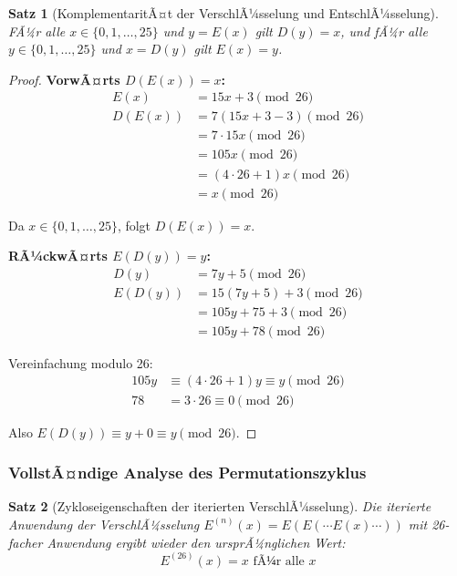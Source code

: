 ﻿\documentclass[12pt,a4paper]{article}
\newtheorem{theorem}{Satz}
\begin{document}
	\begin{theorem}[KomplementaritÃ¤t der VerschlÃ¼sselung und EntschlÃ¼sselung]
		FÃ¼r alle $x \in \{0, 1, \ldots, 25\}$ und $y = E(x)$ gilt $D(y) = x$, und fÃ¼r alle $y \in \{0, 1, \ldots, 25\}$ und $x = D(y)$ gilt $E(x) = y$.
	\end{theorem}
	
	\begin{proof}
		\textbf{VorwÃ¤rts $D(E(x)) = x$:}
		\begin{align}
			E(x) &= 15x + 3 \pmod{26} \\
			D(E(x)) &= 7(15x + 3 - 3) \pmod{26} \\
			&= 7 \cdot 15x \pmod{26} \\
			&= 105x \pmod{26} \\
			&= (4 \cdot 26 + 1)x \pmod{26} \\
			&= x \pmod{26}
		\end{align}
		
		Da $x \in \{0, 1, \ldots, 25\}$, folgt $D(E(x)) = x$. \checkmark
		
		\textbf{RÃ¼ckwÃ¤rts $E(D(y)) = y$:}
		\begin{align}
			D(y) &= 7y + 5 \pmod{26} \\
			E(D(y)) &= 15(7y + 5) + 3 \pmod{26} \\
			&= 105y + 75 + 3 \pmod{26} \\
			&= 105y + 78 \pmod{26}
		\end{align}
		
		Vereinfachung modulo 26:
		\begin{align}
			105y &\equiv (4 \cdot 26 + 1)y \equiv y \pmod{26} \\
			78 &= 3 \cdot 26 \equiv 0 \pmod{26}
		\end{align}
		
		Also $E(D(y)) \equiv y + 0 \equiv y \pmod{26}$. \checkmark
	\end{proof}
	
	\subsubsection{VollstÃ¤ndige Analyse des Permutationszyklus}
	
	\begin{theorem}[Zykloseigenschaften der iterierten VerschlÃ¼sselung]
		Die iterierte Anwendung der VerschlÃ¼sselung $E^{(n)}(x) = E(E(\cdots E(x) \cdots))$ mit 26-facher Anwendung ergibt wieder den ursprÃ¼nglichen Wert:
		\begin{equation}
			E^{(26)}(x) = x \text{ fÃ¼r alle } x
		\end{equation}
	\end{theorem}
	
\end{document}
